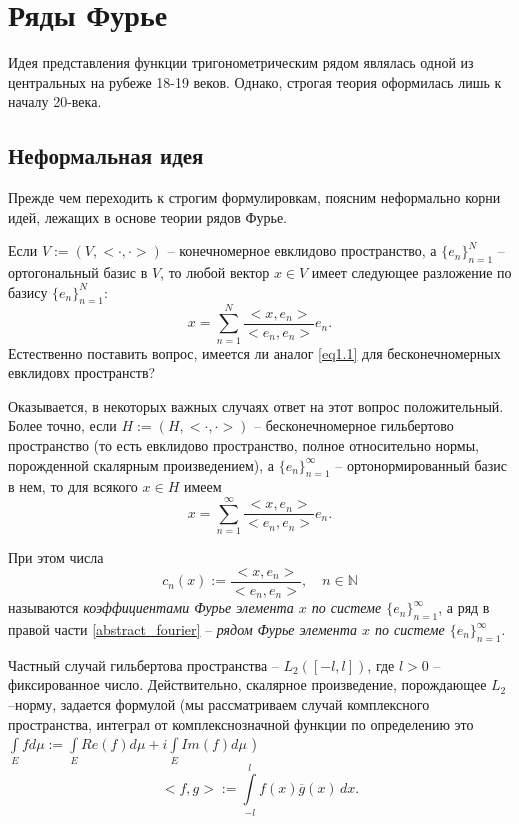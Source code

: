 \newpage
\section{Ряды Фурье}


Идея представления функции тригонометрическим рядом являлась одной из центральных на рубеже 18-19 веков. Однако, строгая теория оформилась лишь к началу 20-века.

\subsection{Неформальная идея}

Прежде чем переходить к строгим формулировкам, поясним неформально корни идей, лежащих в основе теории рядов Фурье.

Если $V:=(V,<\cdot,\cdot>)$ -- конечномерное евклидово пространство, а $\{e_{n}\}_{n=1}^{N}$ -- ортогональный базис в $V$, то любой вектор $x \in V$
имеет следующее разложение по базису $\{e_{n}\}_{n=1}^{N}$:
\begin{equation}
\label{eq1.1}
x=\sum\limits_{n=1}^{N} \frac{<x,e_{n}>}{<e_{n},e_{n}>}e_{n}.
\end{equation}
Естественно поставить вопрос, имеется ли аналог \eqref{eq1.1} для бесконечномерных евклидовх пространств?

Оказывается, в некоторых важных случаях ответ на этот вопрос положительный. Более точно, если $H:=(H,<\cdot,\cdot>)$ -- бесконечномерное гильбертово пространство (то есть евклидово пространство, полное относительно нормы, порожденной скалярным произведением), а $\{e_{n}\}_{n=1}^{\infty}$ -- ортонормированный базис в нем, то для всякого $x \in H$ имеем
\begin{equation}
\label{abstract_fourier}
x=\sum\limits_{n=1}^{\infty} \frac{<x,e_{n}>}{<e_{n},e_{n}>} e_{n}.
\end{equation}

При этом числа
\begin{equation}
\label{eqq.Fourier_coeff}
c_{n}(x):=\frac{<x,e_{n}>}{<e_{n},e_{n}>}, \quad n \in \mathbb{N}
\end{equation}
называются \textit{коэффициентами Фурье элемента $x$ по системе $\{e_{n}\}_{n=1}^{\infty}$}, а ряд в правой части \eqref{abstract_fourier} -- \textit{рядом Фурье
элемента $x$ по системе $\{e_{n}\}_{n=1}^{\infty}$}.

Частный случай гильбертова пространства -- $L_{2}([-l,l])$, где $l > 0$ -- фиксированное число. 
Действительно, скалярное произведение, порождающее $L_{2}$--норму, задается формулой (мы рассматриваем случай комплексного пространства, интеграл от комплекснозначной функции по определению это $\int\limits_E f d\mu := \int\limits_E Re(f)d\mu + i\int\limits_E Im(f)d\mu$ )
$$
<f,g>:=\int\limits_{-l}^{l}f(x)\overline{g}(x)\,dx.
$$


